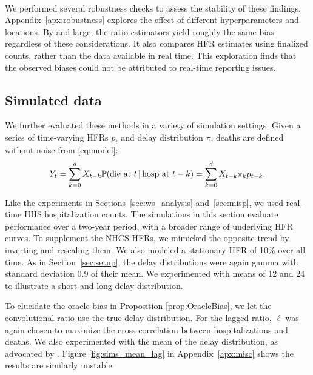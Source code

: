 \documentclass{article}
\newcommand{\given}{\, \vert \,}
\begin{document}
\paragraph{}

We performed several robustness checks to assess the stability of these findings. Appendix~\ref{apx:robustness} explores the effect of different hyperparameters and locations. By and large, the ratio estimators yield roughly the same bias regardless of these considerations. It also compares HFR estimates using finalized counts, rather than the data available in real time. This exploration finds that the observed biases could not be attributed to real-time reporting issues. 

\subsection{Simulated data}\label{sec:results_sim}

We further evaluated these methods in a variety of simulation settings. Given a series of time-varying HFRs $p_t$ and delay distribution $\pi$, deaths are defined without noise from \eqref{eq:model}:
$$Y_t = \sum_{k=0}^d X_{t-k} \P(\text{die at $t$}\given\text{hosp at }t-k) = \sum_{k=0}^d X_{t-k} \pi_k p_{t-k}.$$

Like the experiments in Sections~\ref{sec:ws_analysis} and~\ref{sec:misp}, we
used real-time HHS hospitalization counts. The simulations in this
section evaluate performance over a two-year period, with a broader range of
underlying HFR curves. To supplement the NHCS HFRs, we mimicked the opposite
trend by inverting and rescaling them. We also modeled a stationary HFR of 10\%
over all time. As in Section~\ref{sec:setup}, the delay distributions were again
gamma with standard deviation 0.9 of their mean. We experimented with means of
12 and 24 to illustrate a short and long delay distribution. 

To elucidate the oracle bias in Proposition \ref{prop:OracleBias}, we let the convolutional ratio use the true delay distribution. For the lagged ratio, $\ell$ was again chosen to maximize the cross-correlation between hospitalizations and deaths. We also experimented with the mean of the delay distribution, as advocated by \citet{lagged_chinese}. Figure \ref{fig:sims_mean_lag} in Appendix~\ref{apx:misc} shows the results are similarly unstable.
\end{document}
